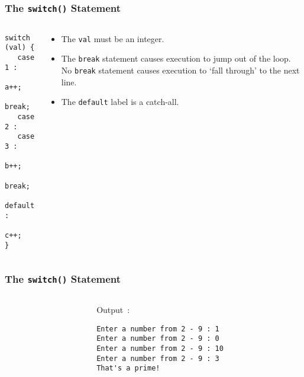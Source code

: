 \begin{frame}[fragile]
\frametitle{The {\tt switch()} Statement}
\begin{columns}

\begin{column}{0.45\textwidth}
\begin{lstlisting}[style=basicc,numbers=none]
switch (val) {
   case 1 :
      a++;
      break;
   case 2 :
   case 3 :
      b++;
      break;
   default :
      c++;
}
\end{lstlisting}
\end{column}

\begin{column}{0.45\textwidth}
\begin{itemize}[<+->]
\item The \verb^val^ must be an integer.
\item The \verb^break^ statement causes execution to jump out
of the loop. No \verb^break^ statement causes execution to
`fall through' to the next line.
\item The \verb^default^ label is a catch-all.
\end{itemize}
\end{column}

\end{columns}
\end{frame}

\begin{frame}[fragile]
\frametitle{The {\tt switch()} Statement}
\begin{columns}

\begin{column}{0.55\textwidth}

\end{column}

\begin{column}{0.40\textwidth}
Output~:
\begin{verbatim}
Enter a number from 2 - 9 : 1
Enter a number from 2 - 9 : 0
Enter a number from 2 - 9 : 10
Enter a number from 2 - 9 : 3
That's a prime!
\end{verbatim}
\end{column}

\end{columns}
\end{frame}

